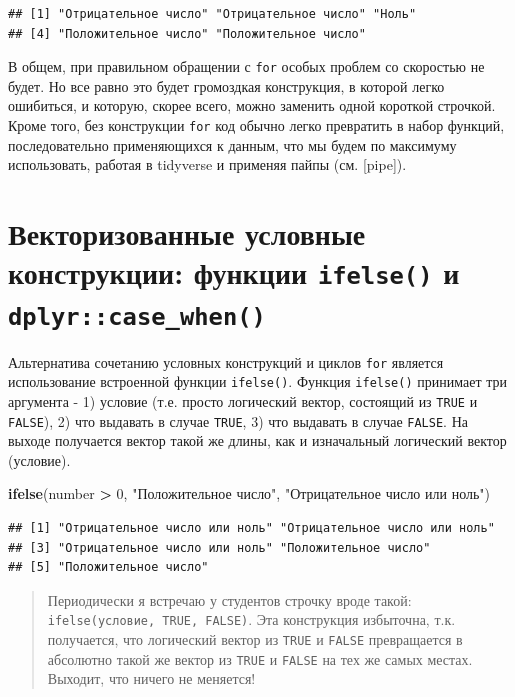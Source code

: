 \documentclass[
]{book}
\newenvironment{Shaded}{\begin{snugshade}}{\end{snugshade}}
\newcommand{\DecValTok}[1]{\textcolor[rgb]{0.00,0.00,0.81}{#1}}
\newcommand{\KeywordTok}[1]{\textcolor[rgb]{0.13,0.29,0.53}{\textbf{#1}}}
\newcommand{\NormalTok}[1]{#1}
\newcommand{\OperatorTok}[1]{\textcolor[rgb]{0.81,0.36,0.00}{\textbf{#1}}}
\newcommand{\StringTok}[1]{\textcolor[rgb]{0.31,0.60,0.02}{#1}}
\begin{document}
\begin{verbatim}
## [1] "Отрицательное число" "Отрицательное число" "Ноль"               
## [4] "Положительное число" "Положительное число"
\end{verbatim}

В общем, при правильном обращении с \texttt{for} особых проблем со скоростью не будет. Но все равно это будет громоздкая конструкция, в которой легко ошибиться, и которую, скорее всего, можно заменить одной короткой строчкой. Кроме того, без конструкции \texttt{for} код обычно легко превратить в набор функций, последовательно применяющихся к данным, что мы будем по максимуму использовать, работая в tidyverse и применяя пайпы (см. {[}pipe{]}).

\hypertarget{ifelse}{%
\section{\texorpdfstring{Векторизованные условные конструкции: функции \texttt{ifelse()} и \texttt{dplyr::case\_when()}}{Векторизованные условные конструкции: функции ifelse() и dplyr::case\_when()}}\label{ifelse}}

Альтернатива сочетанию условных конструкций и циклов \texttt{for} является использование встроенной функции \texttt{ifelse()}. Функция \texttt{ifelse()} принимает три аргумента - 1) условие (т.е. просто логический вектор, состоящий из \texttt{TRUE} и \texttt{FALSE}), 2) что выдавать в случае \texttt{TRUE}, 3) что выдавать в случае \texttt{FALSE}. На выходе получается вектор такой же длины, как и изначальный логический вектор (условие).

\begin{Shaded}
\begin{Highlighting}[]
\KeywordTok{ifelse}\NormalTok{(number }\OperatorTok{>}\StringTok{ }\DecValTok{0}\NormalTok{, }\StringTok{"Положительное число"}\NormalTok{, }\StringTok{"Отрицательное число или ноль"}\NormalTok{)}
\end{Highlighting}
\end{Shaded}

\begin{verbatim}
## [1] "Отрицательное число или ноль" "Отрицательное число или ноль"
## [3] "Отрицательное число или ноль" "Положительное число"         
## [5] "Положительное число"
\end{verbatim}

\begin{quote}
Периодически я встречаю у студентов строчку вроде такой: \texttt{ifelse(условие,\ TRUE,\ FALSE)}. Эта конструкция избыточна, т.к. получается, что логический вектор из \texttt{TRUE} и \texttt{FALSE} превращается в абсолютно такой же вектор из \texttt{TRUE} и \texttt{FALSE} на тех же самых местах. Выходит, что ничего не меняется!
\end{quote}
\end{document}
